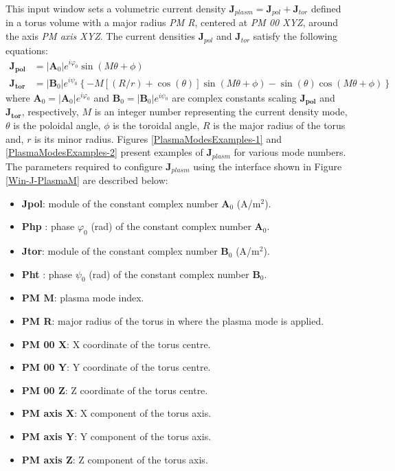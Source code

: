 This input window sets a volumetric current density $\textbf{J}_{plasm} = \textbf{J}_{pol} + \textbf{J}_{tor}$ defined in a torus volume with a major radius \emph{PM R}, centered at \emph{PM 00 XYZ}, around the axis \emph{PM axis XYZ}. The current densities $\textbf{J}_{pol}$ and $\textbf{J}_{tor}$ satisfy the following equations:
\begin{equation}\label{PlasmaModeJ}
	\begin{aligned}
		\mathbf{J_{pol}} &= \left|\mathbf{A}_{0}\right|e^{i\varphi_{0}}\sin\left(M\theta+\phi\right)
		\\
		\mathbf{J_{tor}} &= \left|\mathbf{B}_{0}\right|e^{i\psi_{0}}\left\lbrace-M\left[\left(R/r\right) + \cos\left(\theta\right)\right]\sin\left(M\theta+\phi\right) - \sin(\theta)\cos\left( M\theta+\phi\right)\right\rbrace 
	\end{aligned}
\end{equation}
where $\mathbf{A}_{0} = \left|\mathbf{A}_{0}\right|e^{i\varphi_{0}}$ and $\mathbf{B}_{0} = \left|\mathbf{B}_{0}\right|e^{i\psi_{0}}$ are complex constants scaling $\mathbf{J_{pol}}$ and $\mathbf{J_{tor}}$, respectively, $M$ is an integer number representing the current density mode, $\theta$ is the poloidal angle, $\phi$ is the toroidal angle, $R$ is the major radius of the torus and, $r$ is its minor radius. Figures \ref{PlasmaModesExamples-1} and \ref{PlasmaModesExamples-2} present examples of $\textbf{J}_{plasm}$ for various mode numbers. The parameters required to configure $\textbf{J}_{plasm}$ using the interface shown in Figure \ref{Win-J-PlasmaM} are described below:
\quad\\
\begin{itemize}\itemsep0em 
	\item \textbf{Jpol}: module of the constant complex number $\mathbf{A}_{0}$ (A/m$^{2}$). 
	\item \textbf{Php }: phase $\varphi_{0}$ (rad) of the constant complex number $\mathbf{A}_{0}$.
	\\
	\item \textbf{Jtor}: module of the constant complex number $\mathbf{B}_{0}$ (A/m$^{2}$). 
	\item \textbf{Pht }: phase $\psi_{0}$ (rad) of the constant complex number $\mathbf{B}_{0}$.
	\\
	\item \textbf{PM M}: plasma mode index.
	\item \textbf{PM R}: major radius of the torus in where the plasma mode is applied.
	\\
	\item \textbf{PM 00 X}: X coordinate of the torus centre.
	\item \textbf{PM 00 Y}: Y coordinate of the torus centre.
	\item \textbf{PM 00 Z}: Z coordinate of the torus centre.
	\\
	\item \textbf{PM axis X}: X component of the torus axis.
	\item \textbf{PM axis Y}: Y component of the torus axis.
	\item \textbf{PM axis Z}: Z component of the torus axis.
\end{itemize}
\quad\\

